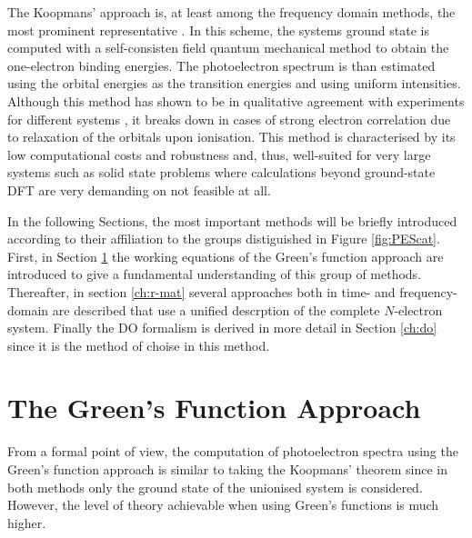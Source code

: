 The Koopmans' approach is, at least among the frequency domain methods, the most prominent representative \cite{Koerzd1,PottsHolland,dos,dos2}.
In this scheme, the systems ground state is computed with a self-consisten field quantum mechanical method to obtain the one-electron binding energies.
The photoelectron spectrum is than estimated using the orbital energies as the transition energies and using uniform intensities.
Although this method has shown to be in qualitative agreement with experiments for different systems \cite{Koerzd1,Koerzd2, EggerKronik,PottsHolland,YepesJaque}, it breaks down in cases of strong electron correlation \cite{2phcederbaum,2phcederbaum2} due to relaxation of the orbitals upon ionisation.
This method is characterised by its low computational costs and robustness and, thus, well-suited for very large systems such as solid state problems where calculations beyond ground-state DFT are very demanding on not feasible at all.

In the following Sections, the most important methods will be briefly introduced according to their affiliation to the groups distiguished in Figure \ref{fig:PEScat}.
First, in Section \ref{ch:gf} the working equations of the Green's function approach are introduced to give a fundamental understanding of this group of methods.
Thereafter, in section \ref{ch:r-mat} several approaches both in time- and frequency-domain are described that use a unified descrption of the complete $N$-electron system.
Finally the DO formalism is derived in more detail in Section \ref{ch:do} since it is the method of choise in this method.

\section{The Green's Function Approach}
\label{ch:gf}
From a formal point of view, the computation of photoelectron spectra using the Green's function approach is similar to taking the Koopmans' theorem since in both methods only the ground state of the unionised system is considered.
However, the level of theory achievable when using Green's functions is much higher.


